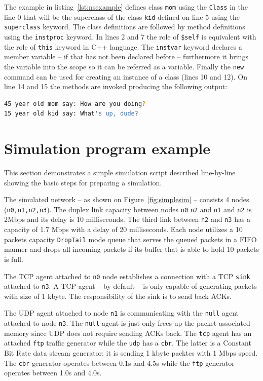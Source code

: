 \documentclass[a4paper]{article}
\begin{document}
The example in listing~\ref{lst:nsexample} defines class \verb!mom! using the \verb!Class! in
the line 0 that will be the superclass of the class \verb!kid! defined on line 5 using the
\verb!-superclass! keyword. The class definitions are followed by method definitions using the
\verb!instproc! keyword. In lines 2 and 7 the role of \verb!$self! is equivalent with the role of
\verb!this! keyword in C++ language. The \verb!instvar! keyword declares a member variable -- if
that has not been declared before -- furthermore it brings the variable into the scope so it can be referred as a
variable. Finally the \verb!new! command can be used for creating an instance of a class (lines 10 and
12). On line 14 and 15 the methods are invoked producing the following output:
\begin{lstlisting}[language=bash]
45 year old mom say: How are you doing?
15 year old kid say: What's up, dude?
\end{lstlisting}

\section{Simulation program example}

This section demonstrates a simple simulation script described line-by-line showing the basic steps for preparing a
simulation.

The simulated network -- as shown on Figure~\ref{fig:simplesim} -- consists 4 nodes (\verb!n0,n1,n2,n3!). The
duplex link capacity between nodes \verb!n0! \verb!n2! and \verb!n1! and
\verb!n2! is 2Mbps and its delay is 10 milliseconds. The third link between \verb!n2! and
\verb!n3! has a capacity of 1.7 Mbps with a delay of 20 milliseconds. Each node utilizes a 10 packets
capacity \verb!DropTail! mode queue that serves the queued packets in a FIFO manner and drops all incoming
packets if its buffer that is able to hold 10 packets is full.

The TCP agent attached to \verb!n0! node establishes a connection with a TCP \verb!sink!
attached to \verb!n3!. A TCP agent -- by default -- is only capable of generating packets with size of 1
kbyte. The responsibility of the sink is to send back ACKs.

The UDP agent attached to node \verb!n1! is communicating with the \verb!null! agent attached
to node \verb!n3!. The \verb!null! agent is just only frees up the packet associated memory
since UDP does not require sending ACKs back. The \verb!tcp! agent has an attached \verb!ftp!
traffic generator while the \verb!udp! has a \verb!cbr!. The latter is a Constant Bit Rate
data stream generator: it is sending 1 kbyte packtes with 1 Mbps speed. The \verb!cbr! generator operates
between 0.1s and 4.5s while the \verb!ftp! generator operates between 1.0s and 4.0s.
\end{document}
